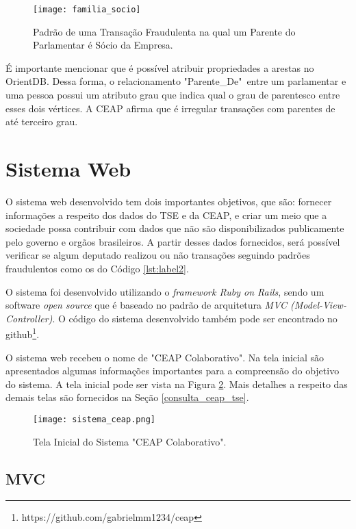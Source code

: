\begin{figure}[H]
\centering
\texttt{[image: familia\_socio]}
\caption{Padrão de uma Transação Fraudulenta na qual um Parente do Parlamentar é Sócio da Empresa.}
\label{fig:familia_socio}
\end{figure}

	É importante mencionar que é possível atribuir propriedades a arestas no OrientDB. Dessa forma, o relacionamento "Parente\_De"\ entre um parlamentar e uma pessoa possui um atributo grau que indica qual o grau de parentesco entre esses dois vértices. A CEAP afirma que é irregular transações com parentes de até terceiro grau.

\section{Sistema Web}

	O sistema web desenvolvido tem dois importantes objetivos, que são: fornecer informações a respeito dos dados do TSE e da CEAP, e criar um meio que a sociedade possa contribuir com dados que não são disponibilizados publicamente pelo governo e orgãos brasileiros. A partir desses dados fornecidos, será possível verificar se algum deputado realizou ou não transações seguindo padrões fraudulentos como os do Código \ref{lst:label2}.
	
	O sistema foi desenvolvido utilizando o \textit{framework Ruby on Rails}, sendo um software \textit{open source} que é baseado no padrão de arquitetura \textit{MVC (Model-View-Controller)}. O código do sistema desenvolvido também pode ser encontrado no github\footnote{https://github.com/gabrielmm1234/ceap}.
	
	O sistema web recebeu o nome de "CEAP Colaborativo". Na tela inicial são apresentados algumas informações importantes para a compreensão do objetivo do sistema. A tela inicial pode ser vista na Figura \ref{fig:sistema_ceap}. Mais detalhes a respeito das demais telas são fornecidos na Seção \ref{consulta_ceap_tse}.

\begin{figure}[H]
\centering
\texttt{[image: sistema\_ceap.png]}
\caption{Tela Inicial do Sistema "CEAP Colaborativo".}
\label{fig:sistema_ceap}
\end{figure}

\subsection{MVC} \label{mvc-subsection}

